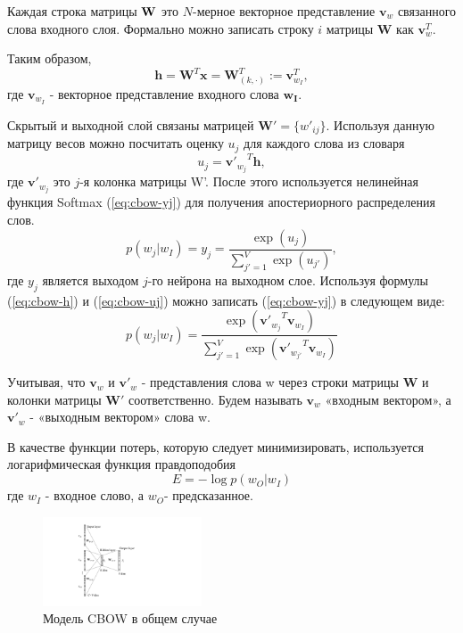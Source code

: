 Каждая строка матрицы ${\textbf W}$ это $N$-мерное векторное представление $\mathbf{v}_w$ связанного слова входного слоя. Формально можно записать строку $i$ матрицы $\textbf{W}$ как $\mathbf{v}_w^T$.

Таким образом, 
\begin{equation}
\mathbf{h} = \mathbf{W}^T \mathbf{x} = \mathbf{W}_{(k, \cdot)}^T := \mathbf{v}_{w_I}^T,
\label{eq:cbow-h}
\end{equation}
где $\mathbf{v}_{w_I}$ - векторное представление входного слова $\mathbf{w_I}$.

Скрытый и выходной слой связаны матрицей $\mathbf{W}' = \{w'_{ij}\}$. Используя данную матрицу весов можно посчитать оценку $u_j$ для каждого слова из словаря
\begin{equation}
u_j = {\mathbf{v}'_{w_j}}^T \mathbf{h},
\label{eq:cbow-uj}
\end{equation}
где  $\mathbf{v}'_{w_j}$ это $j$-я колонка матрицы W'. После этого используется нелинейная функция Softmax (\ref{eq:cbow-yj}) для получения апостериорного распределения слов.
\begin{equation}
p(w_j | w_I) = y_j = \frac{\exp(u_j)}{\sum_{j'=1}^V\exp(u_{j'})},
\label{eq:cbow-yj}
\end{equation}
где $y_j$ является выходом $j$-го нейрона на выходном слое.
Используя формулы (\ref{eq:cbow-h}) и (\ref{eq:cbow-uj}) можно записать (\ref{eq:cbow-yj}) в следующем виде:
\begin{equation}
p(w_j | w_I) = \frac{\exp\left({\mathbf{v}'_{w_j}}^T\mathbf{v}_{w_I}\right)}{\sum_{j'=1}^V\exp\left({\mathbf{v}'_{w_{j'}}}^T\mathbf{v}_{w_I}\right)}
\label{eq:cbow-pwo}
\end{equation}

Учитывая,  что $\mathbf{v}_w$ и $\mathbf{v}'_w$ - представления слова w через строки матрицы $\mathbf{W}$ и колонки матрицы $\mathbf{W'}$ соответственно. Будем называть $\mathbf{v}_w$  «входным вектором», а $\mathbf{v}'_w$ - «выходным вектором» слова w. 

В качестве функции потерь, которую следует минимизировать, используется логарифмическая функция правдоподобия
\begin{equation}
E=-\log p(w_O|w_I)
\label{eq:cbow-loss}
\end{equation}
где $w_I$ - входное слово, а $w_O$- предсказанное.

\begin{figure}[t]
\centering
\includegraphics[width=0.42\textwidth]{img/cbow-multi.pdf}
\caption{\label{fig:cbow-multi} Модель CBOW в общем случае}
\end{figure}

